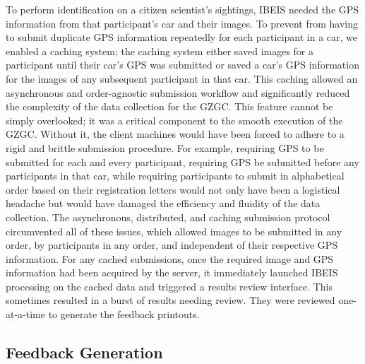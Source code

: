 To perform identification on a citizen scientist's sightings, IBEIS needed the GPS information from that participant's car and their images.  To prevent from having to submit duplicate GPS information repeatedly for each participant in a car, we enabled a caching system; the caching system either saved images for a participant until their car's GPS was submitted or saved a car's GPS information for the images of any subsequent participant in that car.  This caching allowed an asynchronous and order-agnostic submission workflow and significantly reduced the complexity of the data collection for the GZGC.  This feature cannot be simply overlooked; it was a critical component to the smooth execution of the GZGC.  Without it, the client machines would have been forced to adhere to a rigid and brittle submission procedure.  For example, requiring GPS to be submitted for each and every participant, requiring GPS be submitted before any participants in that car, while requiring participants to submit in alphabetical order based on their registration letters would not only have been a logistical headache but would have damaged the efficiency and fluidity of the data collection.  The asynchronous, distributed, and caching submission protocol circumvented all of these issues, which allowed images to be submitted in any order, by participants in any order, and independent of their respective GPS information.  For any cached submissions, once the required image and GPS information had been acquired by the server, it immediately launched IBEIS processing on the cached data and triggered a results review interface.  This sometimes resulted in a burst of results needing review.  They were reviewed one-at-a-time to generate the feedback printouts.

\subsection{Feedback Generation} \label{sec:feedback}

